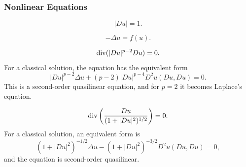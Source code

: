 \subsubsection{Nonlinear Equations}
\label{sec:examples-nonlinear-equations}

\begin{example}
\label{ex:eikonal-equation}





$$|Du| = 1.$$
\end{example}

\begin{example}
\label{ex:nonlinear-poisson-equation}





$$-\Delta u = f(u).$$
\end{example}

\begin{example}
\label{ex:p-laplacian-equation}





$$\operatorname{div}(|Du|^{p-2}Du) = 0.$$
For a classical solution, the equation has the equivalent form
$$|Du|^{p-2}\Delta u + (p-2)|Du|^{p-4}D^2u(Du,Du) = 0.$$
This is a second-order quasilinear equation, and for $p=2$ it becomes Laplace's equation.
\end{example}

\begin{example}
\label{ex:minimal-surface-equation}





$$\operatorname{div}\left(\frac{Du}{(1+|Du|^2)^{1/2}}\right) = 0.$$
For a classical solution, an equivalent form is
$$(1+|Du|^2)^{-1/2}\Delta u - (1+|Du|^2)^{-3/2}D^2u(Du,Du) = 0,$$
and the equation is second-order quasilinear.
\end{example}

